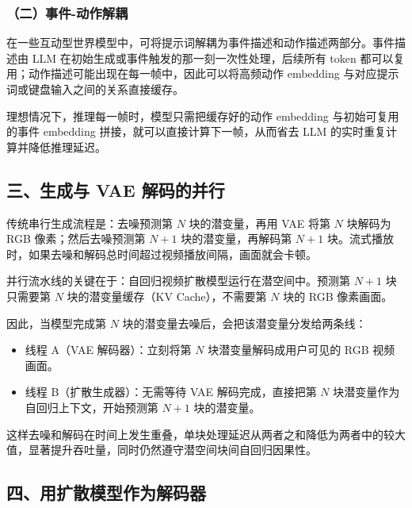 \hypertarget{ux4e8cux4e8bux4ef6-ux52a8ux4f5cux89e3ux8026}{%
\subsubsection{（二）事件-动作解耦}\label{ux4e8cux4e8bux4ef6-ux52a8ux4f5cux89e3ux8026}}

在一些互动型世界模型中，可将提示词解耦为事件描述和动作描述两部分。事件描述由 LLM 在初始生成或事件触发的那一刻一次性处理，后续所有 token 都可以复用；动作描述可能出现在每一帧中，因此可以将高频动作 embedding 与对应提示词或键盘输入之间的关系直接缓存。

理想情况下，推理每一帧时，模型只需把缓存好的动作 embedding 与初始可复用的事件 embedding 拼接，就可以直接计算下一帧，从而省去 LLM 的实时重复计算并降低推理延迟。

\hypertarget{ux4e09ux751fux6210ux4e0e-vae-ux89e3ux7801ux7684ux5e76ux884c}{%
\subsection{三、生成与 VAE 解码的并行}\label{ux4e09ux751fux6210ux4e0e-vae-ux89e3ux7801ux7684ux5e76ux884c}}

传统串行生成流程是：去噪预测第 \(N\) 块的潜变量，再用 VAE 将第 \(N\) 块解码为 RGB 像素；然后去噪预测第 \(N+1\) 块的潜变量，再解码第 \(N+1\) 块。流式播放时，如果去噪和解码总时间超过视频播放间隔，画面就会卡顿。

并行流水线的关键在于：自回归视频扩散模型运行在潜空间中。预测第 \(N+1\) 块只需要第 \(N\) 块的潜变量缓存（KV Cache），不需要第 \(N\) 块的 RGB 像素画面。

因此，当模型完成第 \(N\) 块的潜变量去噪后，会把该潜变量分发给两条线：

\begin{itemize}
\tightlist
\item
  线程 A（VAE 解码器）：立刻将第 \(N\) 块潜变量解码成用户可见的 RGB 视频画面。
\item
  线程 B（扩散生成器）：无需等待 VAE 解码完成，直接把第 \(N\) 块潜变量作为自回归上下文，开始预测第 \(N+1\) 块的潜变量。
\end{itemize}

这样去噪和解码在时间上发生重叠，单块处理延迟从两者之和降低为两者中的较大值，显著提升吞吐量，同时仍然遵守潜空间块间自回归因果性。

\hypertarget{ux56dbux7528ux6269ux6563ux6a21ux578bux4f5cux4e3aux89e3ux7801ux5668}{%
\subsection{四、用扩散模型作为解码器}\label{ux56dbux7528ux6269ux6563ux6a21ux578bux4f5cux4e3aux89e3ux7801ux5668}}

